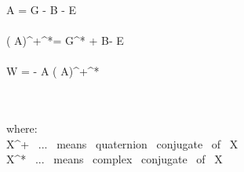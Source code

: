\widehat{ \Box } \widehat A = G - \vec B - \imath{} \vec E \\\\

(\widehat{ \Box } \widehat A)^+^*= G^* + \vec B-\imath{} \vec E \\\\

\widehat W =  -  \widehat{ \Box } \widehat A (\widehat{ \Box } \widehat A)^+^*


\\\\

where: 
\\
\widehat X^+ \ ... \ means \ quaternion \ conjugate \ of \ \widehat X
\\
\widehat X^* \ ...  \ means \ complex \ conjugate \ of \ \widehat X  


